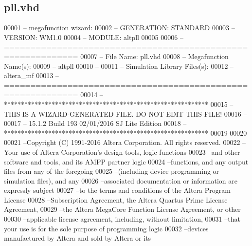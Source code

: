 \subsection{pll.\+vhd}
\label{pll_8vhd_source}

\begin{DoxyCode}
00001 \textcolor{keyword}{-- megafunction wizard: %
00002 \textcolor{keyword}{-- GENERATION: STANDARD}
00003 \textcolor{keyword}{-- VERSION: WM1.0}
00004 \textcolor{keyword}{-- MODULE: altpll }
00005 
00006 \textcolor{keyword}{-- ============================================================}
00007 \textcolor{keyword}{-- File Name: pll.vhd}
00008 \textcolor{keyword}{-- Megafunction Name(s):}
00009 \textcolor{keyword}{--          altpll}
00010 \textcolor{keyword}{--}
00011 \textcolor{keyword}{-- Simulation Library Files(s):}
00012 \textcolor{keyword}{--          altera\_mf}
00013 \textcolor{keyword}{-- ============================================================}
00014 \textcolor{keyword}{-- ************************************************************}
00015 \textcolor{keyword}{-- THIS IS A WIZARD-GENERATED FILE. DO NOT EDIT THIS FILE!}
00016 \textcolor{keyword}{--}
00017 \textcolor{keyword}{-- 15.1.2 Build 193 02/01/2016 SJ Lite Edition}
00018 \textcolor{keyword}{-- ************************************************************}
00019 
00020 
00021 \textcolor{keyword}{--Copyright (C) 1991-2016 Altera Corporation. All rights reserved.}
00022 \textcolor{keyword}{--Your use of Altera Corporation's design tools, logic functions }
00023 \textcolor{keyword}{--and other software and tools, and its AMPP partner logic }
00024 \textcolor{keyword}{--functions, and any output files from any of the foregoing }
00025 \textcolor{keyword}{--(including device programming or simulation files), and any }
00026 \textcolor{keyword}{--associated documentation or information are expressly subject }
00027 \textcolor{keyword}{--to the terms and conditions of the Altera Program License }
00028 \textcolor{keyword}{--Subscription Agreement, the Altera Quartus Prime License Agreement,}
00029 \textcolor{keyword}{--the Altera MegaCore Function License Agreement, or other }
00030 \textcolor{keyword}{--applicable license agreement, including, without limitation, }
00031 \textcolor{keyword}{--that your use is for the sole purpose of programming logic }
00032 \textcolor{keyword}{--devices manufactured by Altera and sold by Altera or its }
}
\end{DoxyCode}
